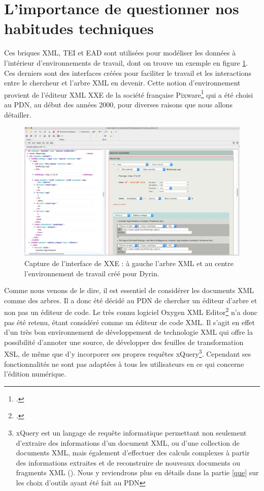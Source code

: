 \documentclass[a4paper,12pt,twoside]{book}
\begin{document}
    \section{L'importance de questionner nos habitudes techniques}
    
    Ces briques \acrshort{XML}, \acrshort{TEI} et \acrshort{EAD} sont utilisées pour modéliser les données à l'intérieur d'environnements de travail, dont on trouve un exemple en figure \ref{envi}. Ces derniers sont des interfaces créées pour faciliter le travail et les interactions entre le chercheur et l'arbre XML en devenir. Cette notion d'environnement provient de l'éditeur XML \acrfull{XXE} de la société française Pixware\footcite{pixware} qui a été choisi au \acrshort{PDN}, au début des années 2000, pour diverses raisons que nous allons détailler.
    
    \begin{figure}[H]
    \centering
    \includegraphics[width=12cm]{img/MaX/env_interface.png}
    \caption{Capture de l'interface de XXE : à gauche l'arbre XML et au centre l'environnement de travail créé pour Dyrin.}
    \label{envi}
\end{figure}
    
    
    Comme nous venons de le dire, il est essentiel de considérer les documents \acrshort{XML} comme des arbres. Il a donc été décidé au \acrshort{PDN} de chercher un éditeur d'arbre et non pas un éditeur de code. Le très connu logiciel Oxygen XML Editor\footcite{oxygen} n'a donc pas été retenu, étant considéré comme un éditeur de code \acrshort{XML}. Il s'agit en effet d'un très bon environnement de développement de technologie \acrshort{XML} qui offre la possibilité d'annoter une source, de développer des feuilles de transformation \acrshort{XSL}, de même que d'y incorporer ses propres requêtes xQuery\footnote{xQuery est un langage de requête informatique permettant non seulement d'extraire des informations d'un document XML, ou d'une collection de documents XML, mais également d'effectuer des calculs complexes à partir des informations extraites et de reconstruire de nouveaux documents ou fragments XML (\cite{xquery}). Nous y reviendrons plus en détails dans la partie \ref{que} sur les choix d'outils ayant été fait au PDN}. Cependant ses fonctionnalités ne sont pas adaptées à tous les utilisateurs en ce qui concerne l'édition numérique.
    
\end{document}

